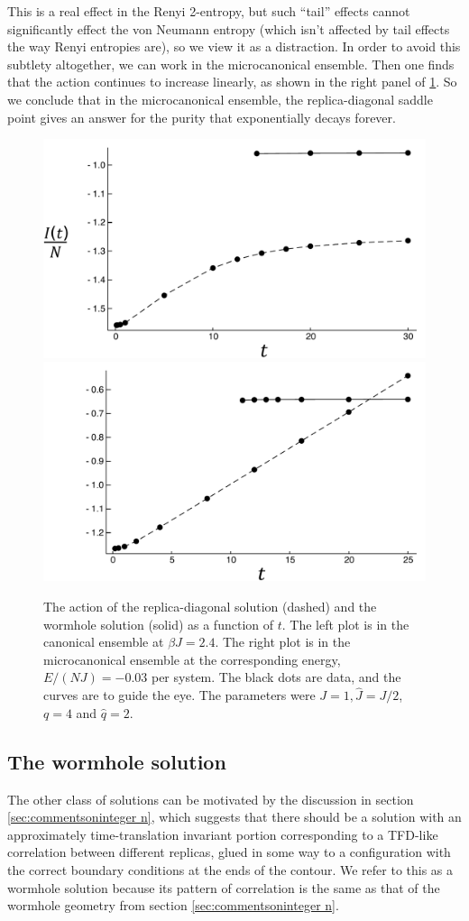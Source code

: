 \documentclass[12pt]{article}
\numberwithin{equation}{section}
\begin{document}
This is a real effect in the Renyi 2-entropy, but such ``tail'' effects cannot significantly effect the von Neumann entropy (which isn't affected by tail effects the way Renyi entropies are), so we view it as a distraction. In order to avoid this subtlety altogether, we can work in the microcanonical ensemble. Then one finds that the action continues to increase linearly, as shown in the right panel of \ref{figAction}. So we conclude that in the microcanonical ensemble, the replica-diagonal saddle point gives an answer for the purity that exponentially decays forever.

\begin{figure}[t]
\begin{center}
\includegraphics[width = .48\textwidth]{images/SYK_canonical.pdf}
\includegraphics[width = .49\textwidth]{images/SYK_microcanonical.pdf}
\caption{{\small The action of the replica-diagonal solution (dashed) and the wormhole solution (solid) as a function of $t$. The left plot is in the canonical ensemble at $\beta J = 2.4$. The right plot is in the microcanonical ensemble at the corresponding energy, $E/(NJ) = -0.03$ per system. The black dots are data, and the curves are to guide the eye. The parameters were $J = 1, \hat{J} = J/2$, $q = 4$ and $\hat{q} = 2$.}}\label{figAction}
\end{center}
\end{figure}

\subsection{The wormhole solution}
The other class of solutions can be motivated by the discussion in section \ref{sec:commentsoninteger n}, which suggests that there should be a solution with an approximately time-translation invariant portion corresponding to a TFD-like correlation between different replicas, glued in some way to a configuration with the correct boundary conditions at the ends of the contour. We refer to this as a wormhole solution because its pattern of correlation is the same as that of the wormhole geometry from section \ref{sec:commentsoninteger n}.
\end{document}
